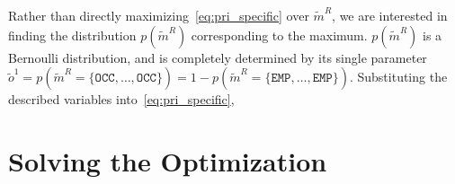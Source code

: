 Rather than directly maximizing~\eqref{eq:pri_specific} over $\tilde{m}^{R}$, we are interested in finding the distribution $p(\tilde{m}^{R})$ corresponding to the maximum. $p(\tilde{m}^{R})$ is a Bernoulli distribution, and is completely determined by its single parameter $\tilde{o}^{1} = p(\tilde{m}^{R} = \{\texttt{OCC},\dots,\texttt{OCC}\}) = 1 - p(\tilde{m}^{R} = \{\texttt{EMP},\dots,\texttt{EMP}\})$. Substituting the described variables into~\eqref{eq:pri_specific},
%

\section{Solving the Optimization}

